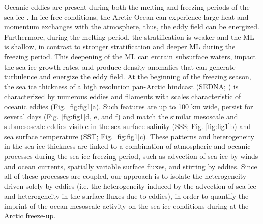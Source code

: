 \documentclass[draft]{agujournal2019}
\begin{document}
Oceanic eddies are present during both the melting and freezing periods of the sea ice \citep{Cassianides_eddy_2021, Kozlov_eddies_2020, Manucharyan_Ice_dynamics_2017}. In ice-free conditions, the Arctic Ocean can experience large heat and momentum exchanges with the atmosphere, thus, the eddy field can be energized. Furthermore, during the melting period, the stratification is weaker and the ML is shallow, in contrast to stronger stratification and deeper ML during the freezing period. This deepening of the ML can entrain subsurface waters, impact the sea-ice growth rates, and produce density anomalies that can generate turbulence and energize the eddy field. 
At the beginning of the freezing season, the sea ice thickness of a high resolution pan-Arctic hindcast (SEDNA; \citealt{SEDNA_2023}) is characterized by numerous eddies and filaments with scales characteristic of oceanic eddies (Fig. \ref{fig:fig1}a). 
Such features are up to 100 km wide, persist for several days (Fig. \ref{fig:fig1}d, e, and f) and match the similar mesoscale and submesoscale eddies visible in the sea surface salinity (SSS; Fig. \ref{fig:fig1}b) and sea surface temperature (SST; Fig. \ref{fig:fig1}c). These patterns and heterogeneity in the sea ice thickness are linked to a combination of atmospheric and oceanic processes during the sea ice freezing period, such as advection of sea ice by winds and ocean currents, spatially variable surface fluxes, and stirring by eddies. Since all of these processes are coupled, our approach is to isolate the heterogeneity driven solely by eddies (i.e. the heterogeneity induced by the advection of sea ice and heterogeneity in the surface fluxes due to eddies), in order to quantify the imprint of the ocean mesoscale activity on the sea ice conditions during at the Arctic freeze-up. 
\end{document}
